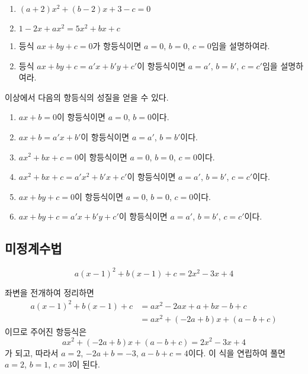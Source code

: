 \documentclass{oblivoir}
\begin{document}

%
\begin{enumerate}\label{iden2}
\item
\((a+2)x^2+(b-2)x+3-c=0\)
\item
\(1-2x+ax^2=5x^2+bx+c\)
\end{enumerate}

\clearpage
%
\prob{}
\begin{enumerate}\label{iden3}
\item
등식 \(ax+by+c=0\)가 항등식이면 \(a=0\), \(b=0\), \(c=0\)임을 설명하여라.
\item
등식 \(ax+by+c=a'x+b'y+c'\)이 항등식이면 \(a=a'\), \(b=b'\), \(c=c'\)임을 설명하여라.
\end{enumerate}


\bigskip\bigskip
이상에서 다음의 항등식의 성질을 얻을 수 있다.
\begin{mdframed}
%
\begin{enumerate}[label=(\emph{\alph*})]
\item
\(ax+b=0\)이 항등식이면 \(a=0\), \(b=0\)이다.
\item
\(ax+b=a'x+b'\)이 항등식이면 \(a=a'\), \(b=b'\)이다.
\item
\(ax^2+bx+c=0\)이 항등식이면 \(a=0\), \(b=0\), \(c=0\)이다.
\item
\(ax^2+bx+c=a'x^2+b'x+c'\)이 항등식이면 \(a=a'\), \(b=b'\), \(c=c'\)이다.
\item
\(ax+by+c=0\)이 항등식이면 \(a=0\), \(b=0\), \(c=0\)이다.
\item
\(ax+by+c=a'x+b'y+c'\)이 항등식이면 \(a=a'\), \(b=b'\), \(c=c'\)이다.
\end{enumerate}
\end{mdframed}

\clearpage
\subsection{미정계수법}

%
\[a(x-1)^2+b(x-1)+c=2x^2-3x+4\]
\begin{mdframed}[frametitle=<풀이1>]
좌변을 전개하여 정리하면
\begin{align*}
a(x-1)^2+b(x-1)+c
&=ax^2-2ax+a+bx-b+c\\
&=ax^2+(-2a+b)x+(a-b+c)
\end{align*}
이므로 주어진 항등식은
\[ax^2+(-2a+b)x+(a-b+c)=2x^2-3x+4\]
가 되고, 따라서 \(a=2\), \(-2a+b=-3\), \(a-b+c=4\)이다.
이 식을 연립하여 풀면 \(a=2\), \(b=1\), \(c=3\)이 된다.
\end{mdframed}
\end{document}
